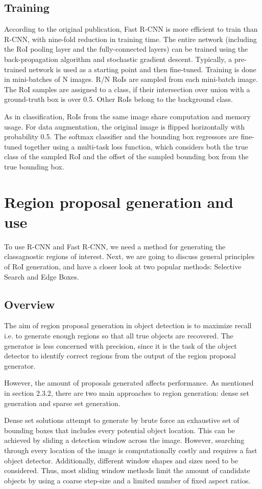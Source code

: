 \subsection{Training}
According to the original publication, Fast R-CNN is more efficient to train than R-CNN, with nine-fold reduction in training time. The entire network (including the RoI pooling layer and the fully-connected layers) can be trained using the back-propagation algorithm and stochastic gradient descent. Typically, a pre-trained network is used as a starting point and then fine-tuned. Training is done in mini-batches of N images. R/N RoIs are sampled from each mini-batch image. The RoI samples are assigned to a class, if their intersection over union with a ground-truth box is over 0.5. Other RoIs belong to the background class.

As in classification, RoIs from the same image share computation and memory usage. For data augmentation, the original image is flipped horizontally with probability 0.5. The softmax classifier and the bounding box regressors are fine-tuned together using a multi-task loss function, which considers both the true class of the sampled RoI and the offset of the sampled bounding box from the true bounding box.

\section{Region proposal generation and use}
To use R-CNN and Fast R-CNN, we need a method for generating the classagnostic regions of interest. Next, we are going to discuss general principles of RoI generation, and have a closer look at two popular methods: Selective Search and Edge Boxes.

\subsection{Overview}
The aim of region proposal generation in object detection is to maximize recall i.e. to generate enough regions so that all true objects are recovered. The generator is less concerned with precision, since it is the task of the object detector to identify correct regions from the output of the region proposal generator.

However, the amount of proposals generated affects performance. As mentioned in section 2.3.2, there are two main approaches to region generation: dense set generation and sparse set generation.

Dense set solutions attempt to generate by brute force an exhaustive set of bounding boxes that includes every potential object location. This can be achieved by sliding a detection window across the image. However, searching through every location of the image is computationally costly and requires a fast object detector. Additionally, different window shapes and sizes need to be considered. Thus, most sliding window methods limit the amount of candidate objects by using a coarse step-size and a limited number of fixed aspect ratios.

